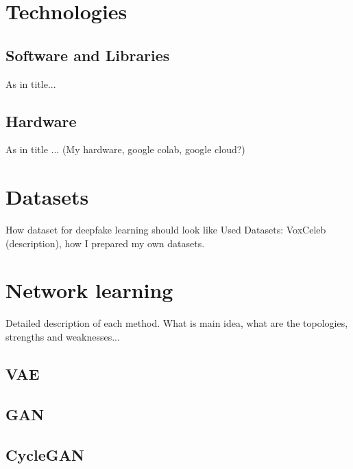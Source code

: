 \section{Technologies}
\subsection{Software and Libraries}
As in title...

\subsection{Hardware}
As in title ... (My hardware, google colab, google cloud?)

\section{Datasets}
How dataset for deepfake learning should look like
Used Datasets: VoxCeleb (description), how I prepared my own datasets.

\section{Network learning}
Detailed description of each method. What is main idea, what are the topologies, strengths and weaknesses...
\subsection{VAE}
\subsection{GAN}
\subsection{CycleGAN}
